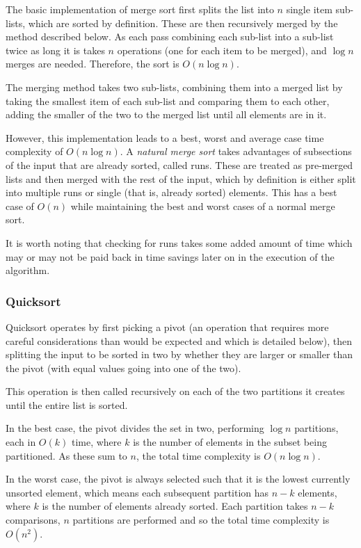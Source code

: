 \documentclass[]{article}
\begin{document}
The basic implementation of merge sort first splits the list into $n$ single item sub-lists, which are sorted by definition. These are then recursively merged by the method described below. As each pass combining each sub-list into a sub-list twice as long it is takes $n$ operations (one for each item to be merged), and $\log{n}$ merges are needed. Therefore, the sort is $O(n\log{n}) $.

The merging method takes two sub-lists, combining them into a merged list by taking the smallest item of each sub-list and comparing them to each other, adding the smaller of the two to the merged list until all elements are in it.

However, this implementation leads to a best, worst and average case time complexity of $O(n\log{n})$. A \emph{natural merge sort} takes advantages of subsections of the input that are already sorted, called runs. These are treated as pre-merged lists and then merged with the rest of the input, which by definition is either split into multiple runs or single (that is, already sorted) elements. This has a best case of $O(n)$ while maintaining the best and worst cases of a normal merge sort.

It is worth noting that checking for runs takes some added amount of time which may or may not be paid back in time savings later on in the execution of the algorithm.

\subsubsection{Quicksort}

Quicksort operates by first picking a pivot (an operation that requires more careful considerations than would be expected and which is detailed below), then splitting the input to be sorted in two by whether they are larger or smaller than the pivot (with equal values going into one of the two).

This operation is then called recursively on each of the two partitions it creates until the entire list is sorted.

In the best case, the pivot divides the set in two, performing $\log{n}$ partitions, each in $O(k)$ time, where $k$ is the number of elements in the subset being partitioned. As these sum to $n$, the total time complexity is $O(n\log{n})$.

In the worst case, the pivot is always selected such that it is the lowest currently unsorted element, which means each subsequent partition has $n-k$ elements, where $k$ is the number of elements already sorted. Each partition takes $n-k$ comparisons, $n$ partitions are performed and so the total time complexity is $O(n^2)$.
\end{document}
